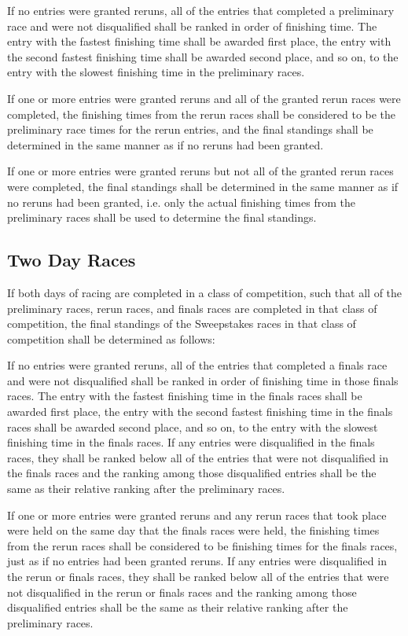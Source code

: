 	If no entries were granted reruns, all of the entries that completed a preliminary race and were not disqualified shall be ranked in order of finishing time. The entry with the fastest finishing time shall be awarded first place, the entry with the second fastest finishing time shall be awarded second place, and so on, to the entry with the slowest finishing time in the preliminary races.

	If one or more entries were granted reruns and all of the granted rerun races were completed, the finishing times from the rerun races shall be considered to be the preliminary race times for the rerun entries, and the final standings shall be determined in the same manner as if no reruns had been granted.

	If one or more entries were granted reruns but not all of the granted rerun races were completed, the final standings shall be determined in the same manner as if no reruns had been granted, i.e. only the actual finishing times from the preliminary races shall be used to determine the final standings.

\subsection{Two Day Races}

	If both days of racing are completed in a class of competition, such that all of the preliminary races, rerun races, and finals races are completed in that class of competition, the final standings of the Sweepstakes races in that class of competition shall be determined as follows:
	\newline

	If no entries were granted reruns, all of the entries that completed a finals race and were not disqualified shall be ranked in order of finishing time in those finals races. The entry with the fastest finishing time in the finals races shall be awarded first place, the entry with the second fastest finishing time in the finals races shall be awarded second place, and so on, to the entry with the slowest finishing time in the finals races. If any entries were disqualified in the finals races, they shall be ranked below all of the entries that were not disqualified in the finals races and the ranking among those disqualified entries shall be the same as their relative ranking after the preliminary races.

	If one or more entries were granted reruns and any rerun races that took place were held on the same day that the finals races were held, the finishing times from the rerun races shall be considered to be finishing times for the finals races, just as if no entries had been granted reruns. If any entries were disqualified in the rerun or finals races, they shall be ranked below all of the entries that were not disqualified in the rerun or finals races and the ranking among those disqualified entries shall be the same as their relative ranking after the preliminary races.


